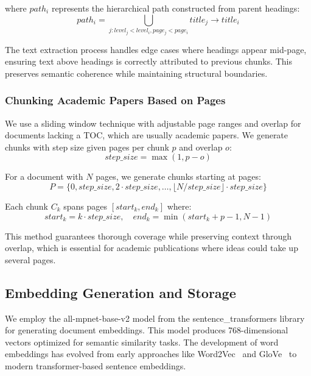\documentclass[runningheads]{llncs}
\begin{document}
where $path_i$ represents the hierarchical path constructed from parent headings:
\begin{equation}
path_i = \bigcup_{j: level_j < level_i, page_j < page_i} title_j \rightarrow title_i
\end{equation}

The text extraction process handles edge cases where headings appear mid-page, ensuring text above headings is correctly attributed to previous chunks. This preserves semantic coherence while maintaining structural boundaries.

\subsubsection{Chunking Academic Papers Based on Pages}

We use a sliding window technique with adjustable page ranges and overlap for documents lacking a TOC, which are usually academic papers. We generate chunks with step size given pages per chunk $p$ and overlap $o$:
\begin{equation}
step\_size = \max(1, p - o)
\end{equation}

For a document with $N$ pages, we generate chunks starting at pages:
\begin{equation}
P = \{0, step\_size, 2 \cdot step\_size, \ldots, \lfloor N/step\_size \rfloor \cdot step\_size\}
\end{equation}

Each chunk $C_k$ spans pages $[start_k, end_k]$ where:
\begin{equation}
start_k = k \cdot step\_size, \quad end_k = \min(start_k + p - 1, N - 1)
\end{equation}

This method guarantees thorough coverage while preserving context through overlap, which is essential for academic publications where ideas could take up several pages.

\subsection{Embedding Generation and Storage}

We employ the all-mpnet-base-v2 model from the sentence\_transformers library~\cite{reimers2019sentence} for generating document embeddings. This model produces 768-dimensional vectors optimized for semantic similarity tasks. The development of word embeddings has evolved from early approaches like Word2Vec~\cite{mikolov2013word2vec} and GloVe~\cite{pennington2014glove} to modern transformer-based sentence embeddings.
\end{document}
